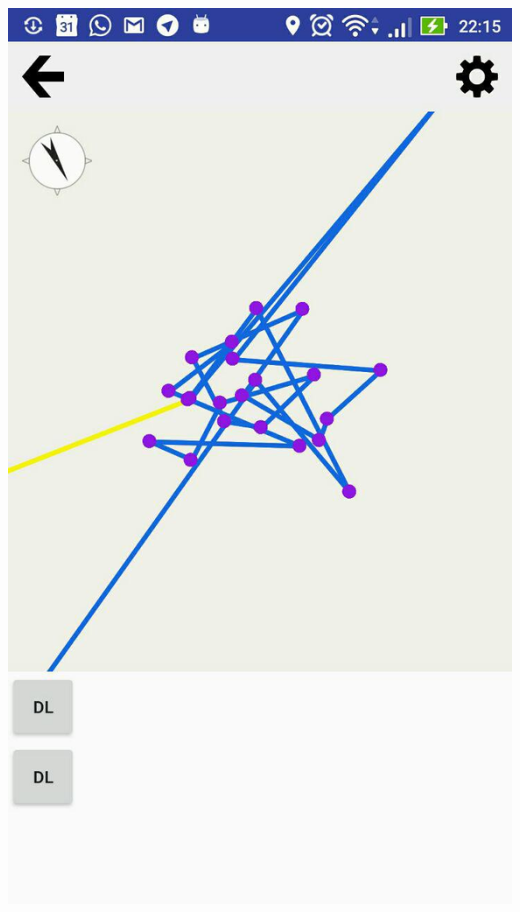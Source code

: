 \documentclass[xcolor=dvipsnames]{beamer}
\begin{document}
\begin{frame}
\begin{columns}
\begin{column}{0.5\textwidth}
\begin{center}
		\includegraphics[width=1\textwidth]{screenshots/vis-readability-2.jpg}
		\end{center}
	\end{column}
	\end{columns}
\end{frame}
\end{document}
